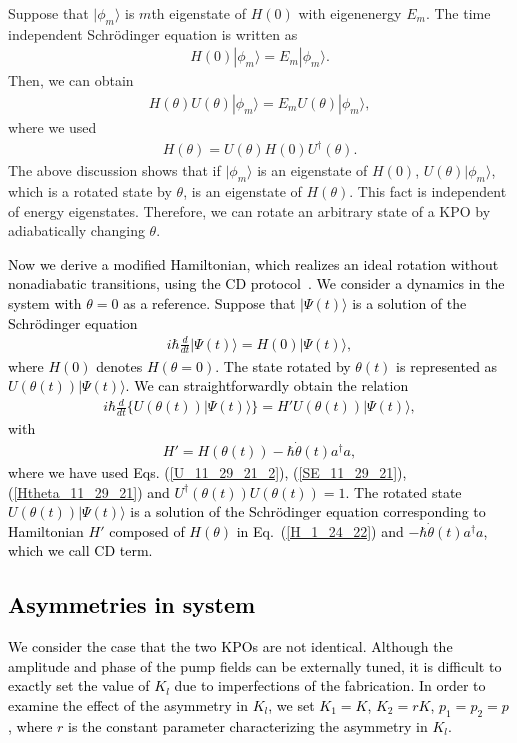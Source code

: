 \documentclass[%
 reprint,
 amsmath,amssymb,
 aps,
pra,
]{revtex4-2}
\begin{document}
Suppose that $|\phi_m\rangle$ is $m$th eigenstate of $H(0)$ with eigenenergy $E_m$.
The time independent Schr\"{o}dinger equation is written as
\begin{eqnarray}
H(0) |\phi_m\rangle = E_m|\phi_m\rangle.
\end{eqnarray}
Then, we can obtain
\begin{eqnarray}
H(\theta) U(\theta) |\phi_m\rangle = E_m U(\theta) |\phi_m\rangle,
\end{eqnarray}
where we used 
\begin{eqnarray}
H(\theta) = U(\theta)  H({0}) U^\dagger(\theta).
\label{Htheta_11_29_21}
\end{eqnarray}
The above discussion shows that if $|\phi_m\rangle$ is an eigenstate of $H(0)$,
$U(\theta)|\phi_m\rangle$, which is a rotated state by $\theta$, is an eigenstate of $H(\theta)$.
This fact is independent of energy eigenstates.
Therefore, we can rotate an arbitrary state of a KPO by adiabatically changing $\theta$.

\textcolor{black}{Now we derive a modified Hamiltonian, which realizes an ideal rotation without nonadiabatic transitions, using the CD protocol~\cite{Rice2003}. 
We consider a dynamics in the system with $\theta=0$ as a reference.
Suppose that $|\Psi(t)\rangle$ is a solution of the Schr\"{o}dinger equation
\begin{eqnarray}
i\hbar \frac{d}{dt} |{\Psi}(t)\rangle = H(0)|\Psi(t)\rangle,
\label{SE_11_29_21}
\end{eqnarray}
where $H(0)$ denotes $H(\theta=0)$.
The state rotated by $\theta(t)$ is represented as $U(\theta(t))|\Psi(t)\rangle$.
We can straightforwardly obtain the relation
\begin{eqnarray}
i\hbar\frac{d}{dt} \big\{ U(\theta(t))|\Psi(t)\rangle \big\} = H' U(\theta(t)) |\Psi(t)\rangle,
\end{eqnarray}
with
\begin{eqnarray}
H' = H(\theta(t)) - \hbar \dot\theta(t) a^\dagger a,   
\end{eqnarray}
where we have used Eqs. (\ref{U_11_29_21_2}), (\ref{SE_11_29_21}), (\ref{Htheta_11_29_21}) and $U^\dagger (\theta(t)) U (\theta(t)) =1$.
The rotated state $U(\theta(t))|\Psi(t)\rangle$ is a solution of the Schr\"{o}dinger equation corresponding to Hamiltonian $H'$ composed of $H(\theta)$ in Eq.~(\ref{H_1_24_22}) and $- \hbar \dot\theta(t) a^\dagger a$, which we call CD term.
}

\textcolor{black}{
\section{Asymmetries in system}
\label{Asymmetry}
}
\textcolor{black}{We consider the case that the two KPOs are not identical.
Although the amplitude and phase of the pump fields can be externally tuned, it is difficult to exactly set the value of $K_l$ due to imperfections of the fabrication.
In order to examine the effect of the asymmetry in $K_l$, we set $K_1=K$, $K_2=rK$, $p_1=p_2=p$, where
$r$ is the constant parameter characterizing the asymmetry in $K_l$.}
\end{document}
